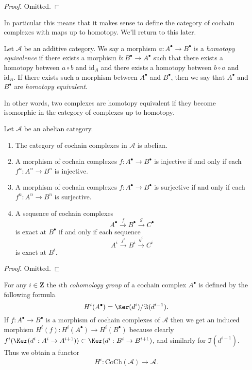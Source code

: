 \begin{proof}
Omitted.
\end{proof}

\noindent
In particular this means that it makes sense to define
the category of cochain complexes with maps up to homotopy.
We'll return to this later.

\begin{definition}
\label{definition-homotopy-equivalent-cochain}
Let $\mathcal{A}$ be an additive category.
We say a morphism $a : A^\bullet \to B^\bullet$
is a {\it homotopy equivalence} if there exists
a morphism $b : B^\bullet \to A^\bullet$
such that there exists a homotopy between
$a \circ b$ and $\text{id}_A$
and there exists a homotopy between $b \circ a$ and $\text{id}_B$.
If there exists such a morphism between $A^\bullet$ and $B^\bullet$, then
we say that $A^\bullet$ and $B^\bullet$ are {\it homotopy equivalent}.
\end{definition}

\noindent
In other words, two complexes are homotopy equivalent if they become
isomorphic in the category of complexes up to homotopy.

\begin{lemma}
\label{lemma-cat-cochain-abelian}
Let $\mathcal{A}$ be an abelian category.
\begin{enumerate}
\item The category of cochain complexes in $\mathcal{A}$ is
abelian.
\item A morphism of cochain complexes
$f : A^\bullet \to B^\bullet$ is injective
if and only if each $f^n : A^n \to B^n$ is injective.
\item A morphism of cochain complexes
$f : A^\bullet \to B^\bullet$ is surjective
if and only if each $f^n : A^n \to B^n$ is surjective.
\item A sequence of cochain complexes
$$
A^\bullet \xrightarrow{f} B^\bullet \xrightarrow{g} C^\bullet
$$
is exact at $B^\bullet$ if and only if each sequence
$$
A^i \xrightarrow{f^i} B^i \xrightarrow{g^i} C^i
$$
is exact at $B^i$.
\end{enumerate}
\end{lemma}

\begin{proof}
Omitted.
\end{proof}

\noindent
For any $i \in \mathbf{Z}$ the $i$th {\it cohomology group}
of a cochain complex $A^\bullet$ is defined by
the following formula
$$
H^i(A^\bullet) = \Ker(d^i)/\Im(d^{i - 1}).
$$
If $f : A^\bullet \to B^\bullet$ is a morphism of cochain
complexes of $\mathcal{A}$ then we get an induced
morphism $H^i(f) : H^i(A^\bullet) \to H^i(B^\bullet)$
because clearly
$f^i(\Ker(d^i : A^i \to A^{i + 1})) \subset
\Ker(d^i : B^i \to B^{i + 1})$, and similarly
for $\Im(d^{i - 1})$.
Thus we obtain a functor
$$
H^i : \text{CoCh}(\mathcal{A}) \longrightarrow \mathcal{A}.
$$

